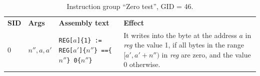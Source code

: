 \documentclass[10pt,twocolumn]{article}
\begin{document}
\begin{table}[!h]
\begin{center}
\def\arraystretch{1.5}
\begin{tabular}{lp{1.2cm}p{5.5cm}p{7.5cm}}
\textbf{SID} & \textbf{Args} & \textbf{Assembly text} & \textbf{Effect}
\\

0 & $ n'',a,a' $ %
& \texttt{REG[}$ a $\texttt{]\{1\} := REG[}$ a' $\texttt{]\{}$ n'' $\texttt{\}
==\{}$ n'' $\texttt{\} 0\{}$ n'' $\texttt{\}} %
& It writes into the byte at the address $ a $ in \textit{reg} the value 1, if
all bytes in the range $ [a',a'+n'') $ in \textit{reg} are zero, and the value 0
otherwise. \\

\end{tabular}
\end{center}
\caption{Instruction group ``Zero test'', GID = 46.}
\label{tab:igroup:zeromemtest}
\end{table}


\end{document}
